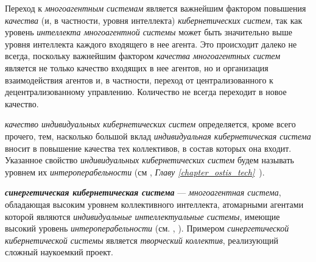 {\label{sec_mas_overall_quality}} 

Переход к \textit{многоагентным системам} является важнейшим фактором повышения \textit{качества} (и, в частности, уровня интеллекта) \textit{кибернетических систем}, так как уровень \textit{интеллекта многоагентной системы} может быть значительно выше уровня интеллекта каждого входящего в нее агента. 
Это происходит далеко не всегда, поскольку важнейшим фактором \textit{качества многоагентных систем} является не только качество входящих в нее агентов, но и организация взаимодействия агентов и, в частности, переход от централизованного к децентрализованному управлению. 
Количество не всегда переходит в новое качество.

\textit{качество индивидуальных кибернетических систем} определяется, кроме всего прочего, тем, насколько большой вклад \textit{индивидуальная кибернетическая система} вносит в повышение качества тех коллективов, в состав которых она входит.
Указанное свойство \textit{индивидуальных кибернетических систем} будем называть уровнем их \textit{интероперабельности} (см , \textit{Главу \ref{chapter_ostis_tech}~}).

\textbf{\textit{синергетическая кибернетическая система}} --- \textit{многоагентная система}, обладающая высоким уровнем коллективного интеллекта, атомарными агентами которой являются \textit{индивидуальные интеллектуальные системы}, имеющие высокий уровень \textit{интероперабельности} (см. , ).
Примером \textit{синергетической кибернетической системы} является \textit{творческий коллектив}, реализующий сложный наукоемкий проект.

